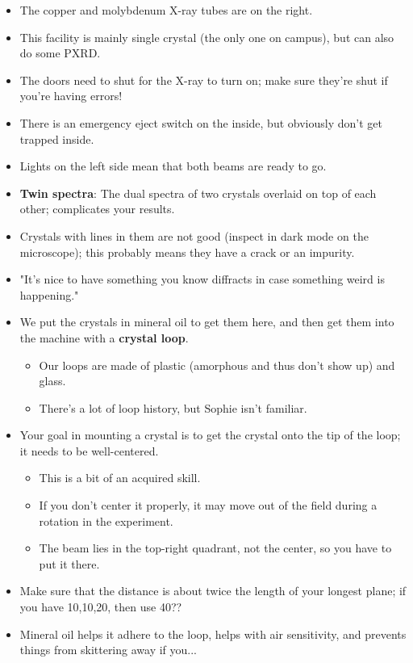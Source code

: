 \documentclass[../notes.tex]{subfiles}
\begin{document}
\begin{itemize}
    \item The copper and molybdenum X-ray tubes are on the right.
    \item This facility is mainly single crystal (the only one on campus), but can also do some PXRD.
    \item The doors need to shut for the X-ray to turn on; make sure they're shut if you're having errors!
    \item There is an emergency eject switch on the inside, but obviously don't get trapped inside.
    \item Lights on the left side mean that both beams are ready to go.
    \item \textbf{Twin spectra}: The dual spectra of two crystals overlaid on top of each other; complicates your results.
    \item Crystals with lines in them are not good (inspect in dark mode on the microscope); this probably means they have a crack or an impurity.
    \item "It's nice to have something you know diffracts in case something weird is happening."
    \item We put the crystals in mineral oil to get them here, and then get them into the machine with a \textbf{crystal loop}.
    \begin{itemize}
        \item Our loops are made of plastic (amorphous and thus don't show up) and glass.
        \item There's a lot of loop history, but Sophie isn't familiar.
    \end{itemize}
    \item Your goal in mounting a crystal is to get the crystal onto the tip of the loop; it needs to be well-centered.
    \begin{itemize}
        \item This is a bit of an acquired skill.
        \item If you don't center it properly, it may move out of the field during a rotation in the experiment.
        \item The beam lies in the top-right quadrant, not the center, so you have to put it there.
    \end{itemize}
    \item Make sure that the distance is about twice the length of your longest plane; if you have 10,10,20, then use 40??
    \item Mineral oil helps it adhere to the loop, helps with air sensitivity, and prevents things from skittering away if you...

\end{itemize}
\end{document}

